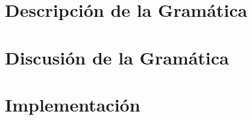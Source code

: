 \documentclass[10pt, a4paper]{article}
\begin{document}
	\maketitle
	\tableofcontents
	
	\newpage
	\section{Descripción de la Gramática}
	
	
	\newpage
	\section{Discusión de la Gramática}
	
	
	\newpage
	\section{Implementaci\'on}
	
	
\end{document}
